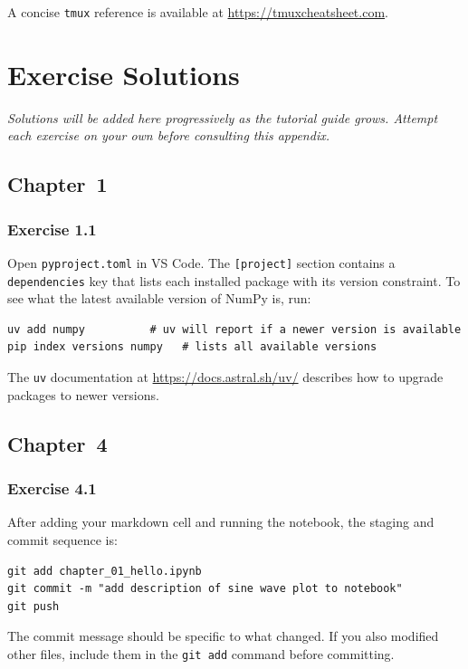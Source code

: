 \documentclass[nobib]{tufte-book}
\begin{document}
A concise \texttt{tmux} reference is available at
\url{https://tmuxcheatsheet.com}.

\chapter{Exercise Solutions}
\label{app:solutions}

\emph{Solutions will be added here progressively as the tutorial guide
grows.
Attempt each exercise on your own before consulting this appendix.}

\section*{Chapter~1}

\subsection*{Exercise 1.1}
Open \texttt{pyproject.toml} in VS Code.
The \texttt{[project]} section contains a \texttt{dependencies} key that
lists each installed package with its version constraint.
To see what the latest available version of NumPy is, run:

\begin{lstlisting}[style=bashstyle]
uv add numpy          # uv will report if a newer version is available
pip index versions numpy   # lists all available versions
\end{lstlisting}

The \texttt{uv} documentation at \url{https://docs.astral.sh/uv/} describes
how to upgrade packages to newer versions.

\section*{Chapter~4}

\subsection*{Exercise 4.1}
After adding your markdown cell and running the notebook, the staging and
commit sequence is:

\begin{lstlisting}[style=bashstyle]
git add chapter_01_hello.ipynb
git commit -m "add description of sine wave plot to notebook"
git push
\end{lstlisting}

The commit message should be specific to what changed.
If you also modified other files, include them in the \texttt{git add}
command before committing.

\end{document}

